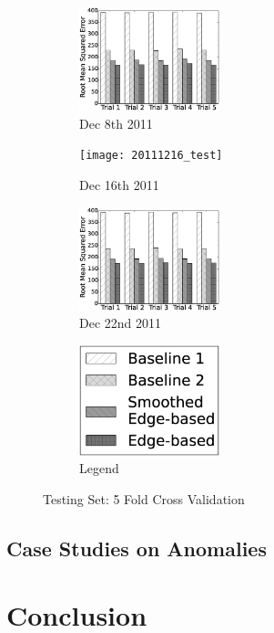 \documentclass{sig-alternate}
\begin{document}
\begin{figure}[htb]
	\centering
	\begin{subfigure}{1.6in}
		\includegraphics[width=1.6in]{20111208_test} %
		\caption{Dec 8th 2011}
		\label{fig:20111208_test}
	\end{subfigure}
	\begin{subfigure}{1.6in}
		\texttt{[image: 20111216\_test]} %
		\caption{Dec 16th 2011}
		\label{fig:20111216_test}
	\end{subfigure}
	\begin{subfigure}{1.6in}
		\includegraphics[width=1.6in]{20111222_test} %
		\caption{Dec 22nd 2011}
		\label{fig:20111222_test}
	\end{subfigure}
	\begin{subfigure}{1.6in}
		\includegraphics[width=1.6in]{legend} %
		\caption{Legend}
		\label{fig:legend_test}
	\end{subfigure}
	\caption{Testing Set: 5 Fold Cross Validation}
	\label{fig:5_fold_test}
\end{figure}

\subsection{Case Studies on Anomalies}

\section{Conclusion}



\end{document}
